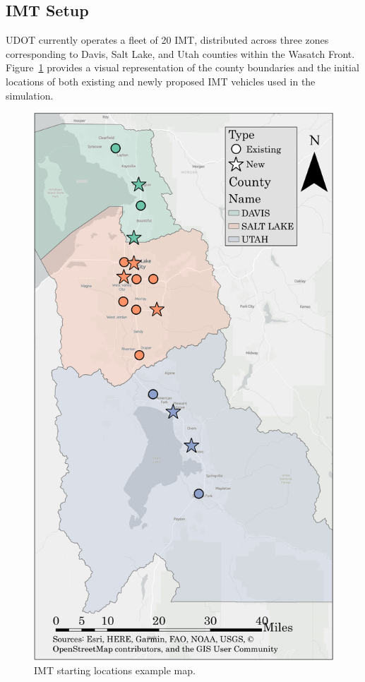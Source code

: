 \documentclass[fancy, oneside, mastersfancy, ms]{byuthesis}
\begin{document}
\hypertarget{sec-IMT_setup}{%
\subsection{IMT Setup}\label{sec-IMT_setup}}

UDOT currently operates a fleet of 20 IMT, distributed across three
zones corresponding to Davis, Salt Lake, and Utah counties within the
Wasatch Front. Figure~\ref{fig-IMT_Map} provides a visual representation
of the county boundaries and the initial locations of both existing and
newly proposed IMT vehicles used in the simulation.

\begin{figure}

{\centering \includegraphics{figures/imt_gray_map.png}

}

\caption{\label{fig-IMT_Map}IMT starting locations example map.}

\end{figure}
\end{document}
